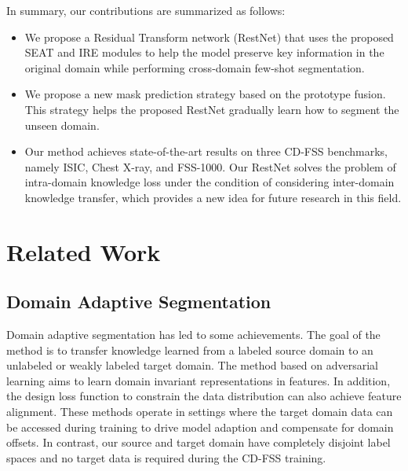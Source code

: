 \documentclass{bmvc2k}
\begin{document}
In summary, our contributions are summarized as follows:
\begin{itemize}
\vspace{-3.5mm}
\item We propose a Residual Transform network (RestNet) that uses the proposed SEAT and IRE modules to help the model preserve key information in the original domain while performing cross-domain few-shot segmentation.
\vspace{-4mm}
\item We propose a new mask prediction strategy based on the prototype fusion. This strategy helps the proposed RestNet gradually learn how to segment the unseen domain.
\vspace{-8mm}
\item Our method achieves state-of-the-art results on three CD-FSS benchmarks, namely ISIC, Chest X-ray, and FSS-1000. Our RestNet solves the problem of intra-domain knowledge loss under the condition of considering inter-domain knowledge transfer, which provides a new idea for future research in this field.
\end{itemize}




\section{Related Work}
\subsection{Domain Adaptive Segmentation}
Domain adaptive segmentation has led to some achievements. 
The goal of the method is to transfer knowledge learned from a labeled source domain to an unlabeled or weakly labeled target domain. 
The method based on adversarial learning \cite{chen2017no, chen2018road, du2019ssf, huang2022multi} aims to learn domain invariant representations in features. In addition, the design loss function \cite{hsu2021darcnn, liu2021source, wang2021exploring} to constrain the data distribution can also achieve feature alignment. 
These methods operate in settings where the target domain data can be accessed during training to drive model adaption and compensate for domain offsets. 
In contrast, our source and target domain have completely disjoint label spaces and no target data is required during the CD-FSS training.
\end{document}
